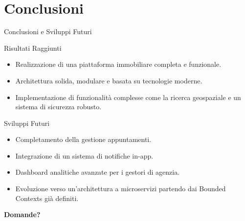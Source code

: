 \documentclass[10pt]{beamer}
\begin{document}
\section{Conclusioni}

\begin{frame}{Conclusioni e Sviluppi Futuri}
    \begin{block}{Risultati Raggiunti}
        \begin{itemize}
            \item Realizzazione di una piattaforma immobiliare completa e funzionale.
            \item Architettura solida, modulare e basata su tecnologie moderne.
            \item Implementazione di funzionalità complesse come la ricerca geospaziale e un sistema di sicurezza robusto.
        \end{itemize}
    \end{block}
    \begin{block}{Sviluppi Futuri}
        \begin{itemize}
            \item Completamento della gestione appuntamenti.
            \item Integrazione di un sistema di notifiche in-app.
            \item Dashboard analitiche avanzate per i gestori di agenzia.
            \item Evoluzione verso un'architettura a microservizi partendo dai Bounded Contexts già definiti.
        \end{itemize}
    \end{block}
\end{frame}

\begin{frame}
    \begin{center}
        \Huge{\textbf{Domande?}}
    \end{center}
\end{frame}
\end{document}
